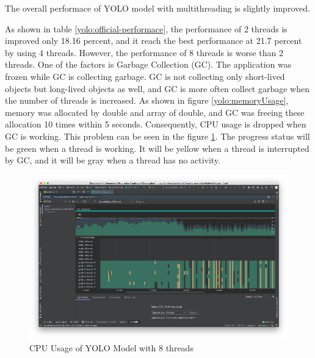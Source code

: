             The overall performace of YOLO model with multithreading is slightly improved.

            As shown in table \ref{yolo:official-performace},
                the performance of 2 threads is improved only 18.16 percent,
                and it reach the best performance at 21.7 percent by using 4 threads.
            However, the performance of 8 threads is worse than 2 threads.
                One of the factors is Garbage Collection (GC).
                The application was frozen while GC is collecting garbage.
            GC is not collecting only short-lived objects but long-lived objects as well,
                and GC is more often collect garbage when the number of threads is increased.
            As shown in figure \ref{yolo:memoryUsage}, memory was allocated by double and array of double,
                and GC was freeing these allocation 10 times within 5 seconds.
            Consequently, CPU usage is dropped when GC is working.
                This problem can be seen in the figure \ref{yolo:cpuUsage}.
                The progress status will be green when a thread is working.
                It will be yellow when a thread is interrupted by GC,
                and it will be gray when a thread has no activity.

            \begin{figure}[!ht]
                \includegraphics[width=6in]{images/chapter5/YOLO/cpu-usage-8threads.png}
                \caption{CPU Usage of YOLO Model with 8 threads}
                \label{yolo:cpuUsage}
            \end{figure}

